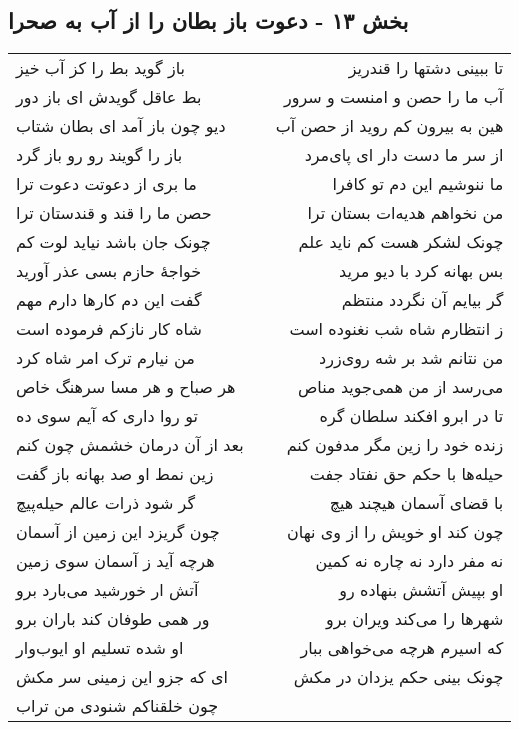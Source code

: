 \begin{center}
\section*{بخش ۱۳ - دعوت باز بطان را از آب به صحرا}
\label{sec:sh013}
\begin{longtable}{l p{0.5cm} r}
باز گوید بط را کز آب خیز
&&
تا ببینی دشتها را قندریز
\\
بط عاقل گویدش ای باز دور
&&
آب ما را حصن و امنست و سرور
\\
دیو چون باز آمد ای بطان شتاب
&&
هین به بیرون کم روید از حصن آب
\\
باز را گویند رو رو باز گرد
&&
از سر ما دست دار ای پای‌مرد
\\
ما بری از دعوتت دعوت ترا
&&
ما ننوشیم این دم تو کافرا
\\
حصن ما را قند و قندستان ترا
&&
من نخواهم هدیه‌ات بستان ترا
\\
چونک جان باشد نیاید لوت کم
&&
چونک لشکر هست کم ناید علم
\\
خواجهٔ حازم بسی عذر آورید
&&
بس بهانه کرد با دیو مرید
\\
گفت این دم کارها دارم مهم
&&
گر بیایم آن نگردد منتظم
\\
شاه کار نازکم فرموده است
&&
ز انتظارم شاه شب نغنوده است
\\
من نیارم ترک امر شاه کرد
&&
من نتانم شد بر شه روی‌زرد
\\
هر صباح و هر مسا سرهنگ خاص
&&
می‌رسد از من همی‌جوید مناص
\\
تو روا داری که آیم سوی ده
&&
تا در ابرو افکند سلطان گره
\\
بعد از آن درمان خشمش چون کنم
&&
زنده خود را زین مگر مدفون کنم
\\
زین نمط او صد بهانه باز گفت
&&
حیله‌ها با حکم حق نفتاد جفت
\\
گر شود ذرات عالم حیله‌پیچ
&&
با قضای آسمان هیچند هیچ
\\
چون گریزد این زمین از آسمان
&&
چون کند او خویش را از وی نهان
\\
هرچه آید ز آسمان سوی زمین
&&
نه مفر دارد نه چاره نه کمین
\\
آتش ار خورشید می‌بارد برو
&&
او بپیش آتشش بنهاده رو
\\
ور همی طوفان کند باران برو
&&
شهرها را می‌کند ویران برو
\\
او شده تسلیم او ایوب‌وار
&&
که اسیرم هرچه می‌خواهی ببار
\\
ای که جزو این زمینی سر مکش
&&
چونک بینی حکم یزدان در مکش
\\
چون خلقناکم شنودی من تراب

\end{longtable}
\end{center}
